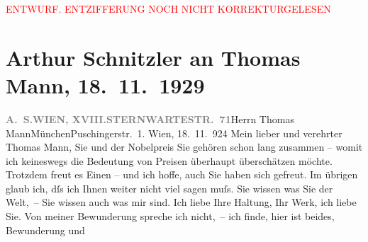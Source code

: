 
\begin{center}
            \textcolor{red}{ENTWURF. ENTZIFFERUNG NOCH NICHT KORREKTURGELESEN}
                      \end{center}
            
               \section[Arthur Schnitzler an Thomas Mann, 18. 11. 1929]{ Arthur Schnitzler an Thomas Mann, 18. 11. 1929}\nopagebreak{}\rehead{ }\begin{ledgroupsized}[t]{13cm}\normalsize\beginnumbering{} \toendnotes[C]{\smallbreak\pagebreak[2]} 
\pstart{}{\pb}\textcolor{gray}{\textbf{A. S.}}\pend{}\pstart{}\textcolor{gray}{\textbf{WIEN, XVIII.}}\pend{}\pstart{}\textcolor{gray}{\textbf{STERNWARTESTR. 71}}\pend{}{\bigskip}\pstart{}{\pb}Herrn Thomas Mann\pend{}\pstart{}München\pend{}\pstart{}Puschingerstr. 1.\pend{}{\bigskip}\pstart
           \raggedleft{}{\pb}Wien, 18. 11. 924\pend
           \pstart{}Mein lieber und verehrter Thomas Mann,\pend\pstart
           Sie und der Nobelpreis Sie gehören schon lang
                    zusammen – womit ich keineswegs die Bedeutung von Preisen überhaupt überschätzen
                    möchte. Trotzdem freut es Einen – und ich hoffe, auch Sie haben sich
                    gefreut.\pend
           \pstart
           Im übrigen glaub ich, dſs ich Ihnen weiter nicht viel sagen muſs. Sie wissen was
                    Sie der Welt, – Sie wissen auch was {\pb}mir sind. Ich liebe Ihre Haltung, Ihr Werk, ich liebe Sie. Von meiner
                    Bewunderung spreche ich nicht, – ich finde, hier ist beides, Bewunderung und

\end{ledgroupsized}
